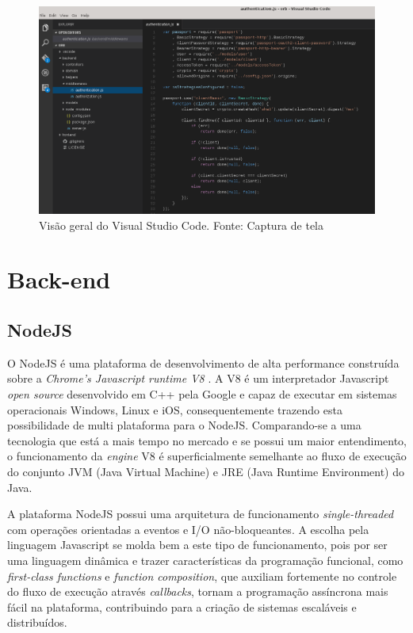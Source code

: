 \begin{figure}[H]
	\centering
	\includegraphics[scale=0.52]{imagens/visualstudio_code.png}
	\caption{\small Visão geral do Visual Studio Code. Fonte: Captura de tela}
	\label{fig:vscode}
\end{figure}

\section{Back-end}
\subsection{NodeJS}
O NodeJS \cite{nodejs} é uma plataforma de desenvolvimento de alta performance construída sobre a \textit{Chrome's Javascript runtime V8} \cite{v8}. A V8 é um interpretador Javascript \textit{open source} desenvolvido em C++ pela Google e capaz de executar em sistemas operacionais Windows, Linux e iOS, consequentemente trazendo esta possibilidade de multi plataforma para o NodeJS. Comparando-se a uma tecnologia que está a mais tempo no mercado e se possui um maior entendimento, o funcionamento da \textit{engine} V8 é superficialmente semelhante ao fluxo de execução do conjunto JVM (Java Virtual Machine) e JRE (Java Runtime Environment) do Java.

A plataforma NodeJS possui uma arquitetura de funcionamento \textit{single-threaded} com operações orientadas a eventos e I/O não-bloqueantes. A escolha pela linguagem Javascript se molda bem a este tipo de funcionamento, pois por ser uma linguagem dinâmica e trazer características da programação funcional, como \textit{first-class functions} e \textit{function composition}, que auxiliam fortemente no controle do fluxo de execução através \textit{callbacks}, tornam a programação assíncrona mais fácil na plataforma, contribuindo para a criação de sistemas escaláveis e distribuídos.

